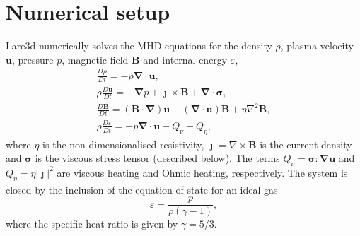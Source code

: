 \documentclass[12pt]{article}
\newcommand{\ten}[1]{{\bm #1}}
\renewcommand{\vec}[1]{{\bm #1}}
\begin{document}
\section{Numerical setup}

Lare3d numerically solves the MHD equations for the density $\rho$, plasma velocity $\vec{u}$, pressure $p$, magnetic field $\vec{B}$ and internal energy $\varepsilon$,
\begin{gather}
\label{eq:mhda}
\frac{D\rho}{Dt} = - \rho \vec{\nabla} \cdot \vec{u},\\
\rho\frac{D\vec{u}}{Dt} = -\vec{\nabla} p + \vec{\jmath} \times \vec{B} + \vec{\nabla} \cdot \ten{\sigma},\\
\frac{D\vec{B}}{Dt} = (\vec{B} \cdot \vec{\nabla})\vec{u} - (\vec{\nabla} \cdot \vec{u})\vec{B} + \eta \nabla^2 \vec{B},\\
\rho\frac{D\varepsilon}{Dt} = -p \vec{\nabla} \cdot \vec{u} + {Q}_{\nu} + {Q}_{\eta},%
\label{eq:energy}
\end{gather}
where $\eta$ is the non-dimensionalised resistivity, $\jmath = \nabla \times \vec{B}$ is the current density and $\ten{\sigma}$ is the viscous stress tensor (described below). The terms ${Q}_{\nu} = \ten{\sigma} : \vec{\nabla}\vec{u}$ and ${Q}_{\eta} = \eta | \vec{\jmath} |^2$ are viscous heating and Ohmic heating, respectively. The system is closed by the inclusion of the equation of state for an ideal gas
\begin{equation}
\varepsilon = \frac{p}{\rho(\gamma - 1)},
\end{equation}
where the specific heat ratio is given by $\gamma = 5/3$.
\end{document}
